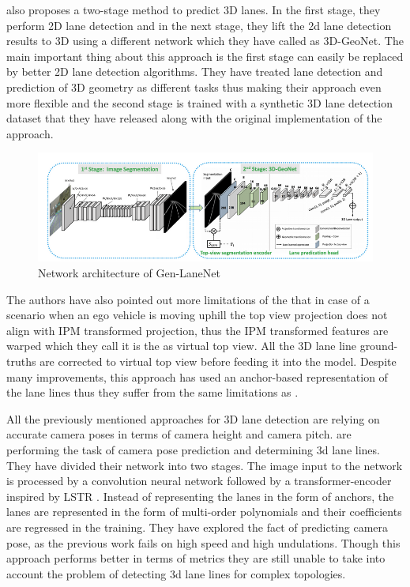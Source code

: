 \cite{guo2020gen} also proposes a two-stage method to predict 3D lanes. In the first stage, they perform 2D lane detection and in the next stage, they lift the 2d lane detection results to 3D using a different network which they have called as 3D-GeoNet. The main important thing about this approach is the first stage can easily be replaced by better 2D lane detection algorithms. They have treated lane detection and prediction of 3D geometry as different tasks thus making their approach even more flexible and the second stage is trained with a synthetic 3D lane detection dataset that they have released along with the original implementation of the approach. 

 \begin{figure}[h]
    \centering
    \includegraphics[width=\textwidth]{images/GenLaneNET.png}
    \caption{Network architecture of Gen-LaneNet \cite{guo2020gen}}
    \end{figure}

The authors have also pointed out more limitations of the \cite{DBLP:journals/corr/abs-1811-10203} that in case of a scenario when an ego vehicle is moving uphill the top view projection does not align with IPM transformed projection, thus the IPM transformed features are warped which they call it is the as virtual top view. All the 3D lane line ground-truths are corrected to virtual top view before feeding it into the model. Despite many improvements, this approach has used an anchor-based representation of the lane lines thus they suffer from the same limitations as \cite{DBLP:journals/corr/abs-1811-10203}. 

All the previously mentioned approaches for 3D lane detection are relying on accurate camera poses in terms of camera height and camera pitch. \cite{DBLP:journals/corr/abs-2112-15351} are performing the task of camera pose prediction and determining 3d lane lines. They have divided their network into two stages. The image input to the network is processed by a convolution neural network followed by a transformer-encoder inspired by LSTR \cite{LSTR}. Instead of representing the lanes in the form of anchors, the lanes are represented in the form of multi-order polynomials and their coefficients are regressed in the training. They have explored the fact of predicting camera pose, as the previous work fails on high speed and high undulations. Though this approach performs better in terms of metrics they are still unable to take into account the problem of detecting 3d lane lines for complex topologies. 

